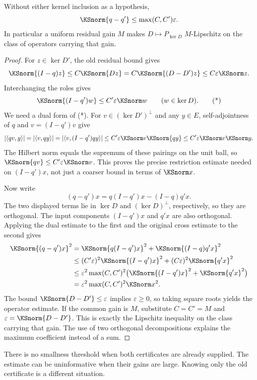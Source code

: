 \begin{KStheorem}\label{KS:KS48}
Without either kernel inclusion as a hypothesis,
\begin{equation}\label{KS:eq:motion}
 \KSnorm{q-q'}\le\max(C,C')\varepsilon.
\end{equation}
In particular a uniform residual gain \(M\) makes \(D\mapsto P_{\ker D}\) \(M\)-Lipschitz on the class of operators carrying that gain.
\end{KStheorem}
\begin{proof}
For $z\in\ker D'$, the old residual bound gives
\[
 \KSnorm{(I-q)z}\le C\KSnorm{Dz}
 =C\KSnorm{(D-D')z}\le C\varepsilon\KSnorm z.
\]
Interchanging the roles gives
\[
 \KSnorm{(I-q')w}\le C'\varepsilon\KSnorm w
 \qquad(w\in\ker D).                                      \tag{*}
\]
We need a dual form of (*). For $v\in(\ker D')^\perp$ and any $y\in E$, self-adjointness of $q$ and $v=(I-q')v$ give
\[
 |\langle qv,y\rangle|
 =|\langle v,qy\rangle|
 =|\langle v,(I-q')qy\rangle|
 \le C'\varepsilon\KSnorm v\KSnorm{qy}
 \le C'\varepsilon\KSnorm v\KSnorm y.
\]
The Hilbert norm equals the supremum of these pairings on the unit ball, so
$\KSnorm{qv}\le C'\varepsilon\KSnorm v$. This proves the precise restriction estimate needed on $(I-q')x$, not just a coarser bound in terms of $\KSnorm x$.

Now write
\[
 (q-q')x=q(I-q')x-(I-q)q'x.
\]
The two displayed terms lie in $\ker D$ and $(\ker D)^\perp$, respectively, so they are orthogonal. The input components $(I-q')x$ and $q'x$ are also orthogonal. Applying the dual estimate to the first and the original cross estimate to the second gives
\[
\begin{aligned}
 \KSnorm{(q-q')x}^2
 &=\KSnorm{q(I-q')x}^2+\KSnorm{(I-q)q'x}^2\\
 &\le (C'\varepsilon)^2\KSnorm{(I-q')x}^2
      +(C\varepsilon)^2\KSnorm{q'x}^2\\
 &\le\varepsilon^2\max(C,C')^2
       \bigl(\KSnorm{(I-q')x}^2+\KSnorm{q'x}^2\bigr)\\
 &=\varepsilon^2\max(C,C')^2\KSnorm x^2.
\end{aligned}
\]
The bound $\KSnorm{D-D'}\le\varepsilon$ implies $\varepsilon\ge0$, so taking square roots yields the operator estimate. If the common gain is $M$, substitute $C=C'=M$ and $\varepsilon=\KSnorm{D-D'}$. This is exactly the Lipschitz inequality on the class carrying that gain. The use of two orthogonal decompositions explains the maximum coefficient instead of a sum.
\end{proof}
There is no smallness threshold when both certificates are already supplied. The estimate can be uninformative when their gains are large. Knowing only the old certificate is a different situation.

